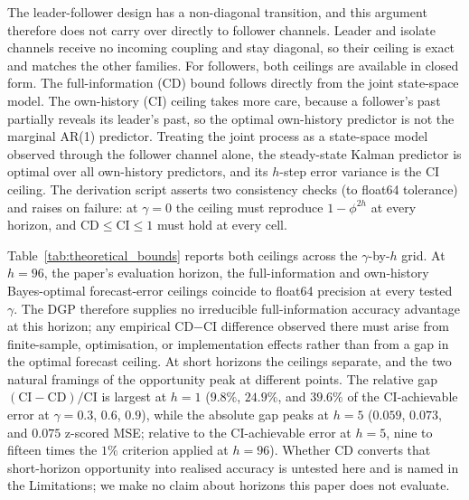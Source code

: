 \documentclass[10pt]{article} %
\begin{document}
    The leader-follower design has a non-diagonal transition, and this argument therefore does not carry over directly to
    follower channels. Leader and isolate channels receive no incoming coupling and stay diagonal, so their ceiling is exact
    and matches the other families. For followers, both ceilings are available in closed form. The full-information (CD)
    bound follows directly from the joint state-space model. The own-history (CI) ceiling takes more care, because a follower's
    past partially reveals its leader's past, so the optimal own-history predictor is not the marginal AR(1) predictor.
    Treating the joint process as a state-space model observed through the follower channel alone, the steady-state Kalman
    predictor is optimal over all own-history predictors, and its $h$-step error variance is the CI ceiling. The derivation
    script asserts two consistency checks (to float64 tolerance) and raises on failure: at $\gamma = 0$ the ceiling must
    reproduce $1 - \phi^{2h}$ at every horizon, and $\text{CD} \le \text{CI} \le 1$ must hold at every cell.

    Table~\ref{tab:theoretical_bounds} reports both ceilings across the $\gamma$-by-$h$ grid. At $h = 96$, the paper's
    evaluation horizon, the full-information and own-history Bayes-optimal forecast-error ceilings coincide to float64
    precision at every tested $\gamma$. The DGP therefore supplies no irreducible full-information accuracy advantage at
    this horizon; any empirical CD$-$CI difference observed there must arise from finite-sample, optimisation, or implementation
    effects rather than from a gap in the optimal forecast ceiling. At short horizons the ceilings separate, and the two
    natural framings of the opportunity peak at different points. The relative gap $(\text{CI} - \text{CD})/\text{CI}$ is
    largest at $h = 1$ ($9.8\%$, $24.9\%$, and $39.6\%$ of the CI-achievable error at $\gamma = 0.3$, $0.6$, $0.9$), while
    the absolute gap peaks at $h = 5$ ($0.059$, $0.073$, and $0.075$ z-scored MSE; relative to the CI-achievable error at
    $h = 5$, nine to fifteen times the $1\%$ criterion applied at $h = 96$). Whether CD converts that short-horizon opportunity
    into realised accuracy is untested here and is named in the Limitations; we make no claim about horizons this paper does
    not evaluate.
\end{document}
